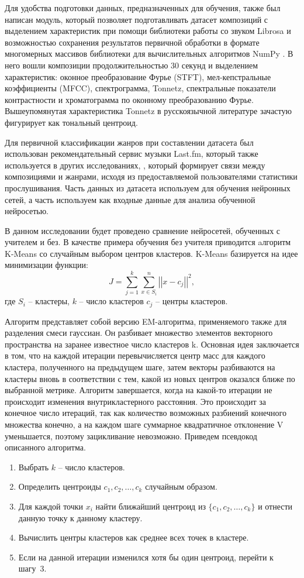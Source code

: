 Для удобства подготовки данных, предназначенных для обучения, также был написан модуль, который позволяет подготавливать датасет композиций
с выделением характеристик при помощи библиотеки работы со звуком Librosa \cite{librosa} и возможностью сохранения результатов первичной обработки в формате многомерных массивов библиотеки для вычислительных алгоритмов NumPy \cite{numpy}.  В него вошли композиции продолжительностью 30 секунд и выделением характеристик: оконное преобразование Фурье (STFT), мел-кепстральные коэффициенты (MFCC), спектрограмма, Tonnetz, спектральные показатели контрастности и хроматограмма по оконному преобразованию Фурье.  Вышеупомянутая характеристика Tonnetz в русскоязычной литературе зачастую фигурирует как тональный центроид.

Для первичной классификации жанров при составлении датасета был использован рекомендательный сервис музыки Last.fm, который также используется в других исследованиях, \cite{lastfm}, который
формирует связи между композициями и жанрами, исходя из предоставляемой пользователями статистики прослушивания.
Часть данных из датасета используем для обучения нейронных сетей, 
а часть используем как входные данные для анализа обученной нейросетью. 

В данном исследовании будет проведено сравнение
нейросетей, обученных с учителем и без. В качестве примера обучения без учителя приводится aлгоритм K-Means со случайным выбором центров кластеров.
K-Means базируется на идее минимизации функции:
\begin{equation}
	J = \sum_{j=1}^k \sum_{x \in S_i}^n \left|\left| x - c_j\right|\right|^2,
\end{equation}
где $S_i$ -- кластеры, $k$ -- число кластеров $c_j$ -- центры кластеров.

Алгоритм представляет собой версию EM-алгоритма, применяемого также для разделения смеси гауссиан. Он разбивает множество элементов векторного пространства на заранее известное число кластеров k.
Основная идея заключается в том, что на каждой итерации перевычисляется центр масс для каждого кластера, полученного на предыдущем шаге, затем векторы разбиваются на кластеры вновь в соответствии с тем, какой из новых центров оказался ближе по выбранной метрике.
Алгоритм завершается, когда на какой-то итерации не происходит изменения внутрикластерного расстояния. Это происходит за конечное число итераций, так как количество возможных разбиений конечного множества конечно, а на каждом шаге суммарное квадратичное отклонение V уменьшается, поэтому зацикливание невозможно.
Приведем псевдокод описанного алгоритма. 
\begin{enumerate}
	\item Выбрать $k$ -- число кластеров.
	\item Определить центроиды $c_1, c_2, \dots, c_k$ случайным образом.
	\item Для каждой точки $x_i$ найти ближайший центроид из $\{c_1, c_2, \dots, c_k\}$ и отнести данную точку к данному кластеру.
	\item Вычислить центры кластеров как среднее всех точек в кластере.
	\item Если на данной итерации изменился хотя бы один центроид, перейти к шагу~3.
\end{enumerate}


